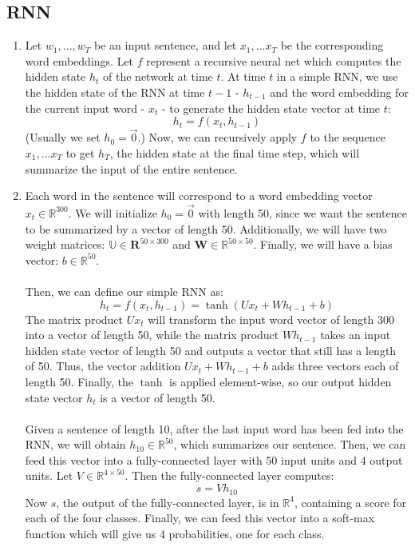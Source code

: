 \documentclass[a4paper]{article}
\begin{document}
\subsection{RNN}

\begin{enumerate}

\item{ Let $w_1,...,w_T$ be an input sentence, and let $x_1,...x_T$ be the corresponding word embeddings. Let $f$ represent a recursive neural net which computes the hidden state $h_t$ of the network at time $t$. At time $t$ in a simple RNN, we use the hidden state of the RNN at time $t-1$ - $h_{t-1}$ and the word embedding for the current input word  - $x_t$ - to generate the hidden state vector at time $t$: 
$$h_t = f(x_t, h_{t-1}) $$ 
(Usually we set $h_0 = \vec{0}$.) Now, we can recursively apply $f$ to the sequence $x_1,...x_T$ to get $h_T$, the hidden state at the final time step, which will summarize the input of the entire sentence.}

\item{ Each word in the sentence will correspond to a word embedding vector $x_t \in \mathbb{R}^{300}$. We will initialize $h_0 = \vec{0}$ with length 50, since we want the sentence to be summarized by a vector of length 50. Additionally, we will have two weight matrices: $\mathbb{U} \in \mathbf{R}^{50 \times 300}$ and $\mathbf{W} \in \mathbb{R}^{50 \times 50}$. Finally, we will have a bias vector: $b \in \mathbb{R}^{50}$.
\\\\
Then, we can define our simple RNN as:
$$
h_t = f(x_t,h_{t-1}) = \tanh (Ux_t + Wh_{t-1} + b)
$$
The matrix product $Ux_t$ will transform the input word vector of length 300 into a vector of length 50, while the matrix product $Wh_{t-1}$ takes an input hidden state vector of length 50 and outputs a vector that still has a length of 50. Thus, the vector addition $Ux_t + Wh_{t-1} + b$ adds three vectors each of length 50. Finally, the $\tanh$ is applied element-wise, so our output hidden state vector $h_t$ is a vector of length 50.
\\\\
Given a sentence of length 10, after the last input word has been fed into the RNN, we will obtain $h_{10} \in \mathbb{R}^{50}$, which summarizes our sentence. Then, we can feed this vector into a fully-connected layer with 50 input units and 4 output units. Let $V \in \mathbb{R}^{4 \times 50}.$ Then the fully-connected layer computes:
$$s = V h_{10} $$
Now $s$, the output of the fully-connected layer, is in $\mathbb{R}^4$, containing a score for each of the four classes. Finally, we can feed this vector into a soft-max function which will give us 4 probabilities, one for each class.  
}

\end{enumerate}
\end{document}
